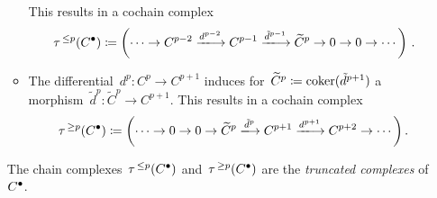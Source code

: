 \begin{remarkdefinition}
\begin{enumerate}
\begin{itemize}
          This results in a cochain complex
          \[
                      \tau^{\,\leq p}(\Cccc)
            \defined  \left(
                        \dotsb
                        \to
                        C^{p-2}
                        \xlongto{d^{p-2}}
                        C^{p-1}
                        \xlongto{\tilde{d}^{p-1}}
                        \widetilde{C}^p
                        \to
                        0
                        \to
                        0
                        \to
                        \dotsb
                      \right) \,.
          \]
        \item
          The differential~$d^p \colon C^p \to C^{p+1}$ induces for~$\widetilde{C}^p \coloneqq \operatorname{coker}(\tilde{d}^{p+1})$ a morphism~$\tilde{d}^p \colon \widetilde{C}^p \to C^{p+1}$.
          This results in a cochain complex
          \[
                      \tau^{\,\geq p}(\Cccc)
            \defined  \left(
                        \dotsb
                        \to
                        0
                        \to
                        0
                        \to
                        \widetilde{C}^p
                        \xlongto{\tilde{d}^p}
                        C^{p+1}
                        \xlongto{d^{p+1}}
                        C^{p+2}
                        \to
                        \dotsb
                      \right).
          \]
      \end{itemize}
      The chain complexes~$\tau^{\,\leq p}(C^\bullet)$ and~$\tau^{\,\geq p}(C^\bullet)$ are the \emph{truncated complexes} of~$C^\bullet$.
  \end{enumerate}
\end{remarkdefinition}



